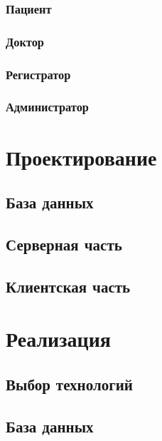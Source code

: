 \documentclass[a4paper,article]{article}
\begin{document}
    \subsubsection{Пациент}

    \subsubsection{Доктор}

    \subsubsection{Регистратор}

    \subsubsection{Администратор}

    \pagestyle{plain}

    \newpage

    \section{Проектирование}

    \subsection{База данных}

    \subsection{Серверная часть}

    \subsection{Клиентская часть}

    \newpage

    \section{Реализация}

    \subsection{Выбор технологий}

    \subsection{База данных}
\end{document}
